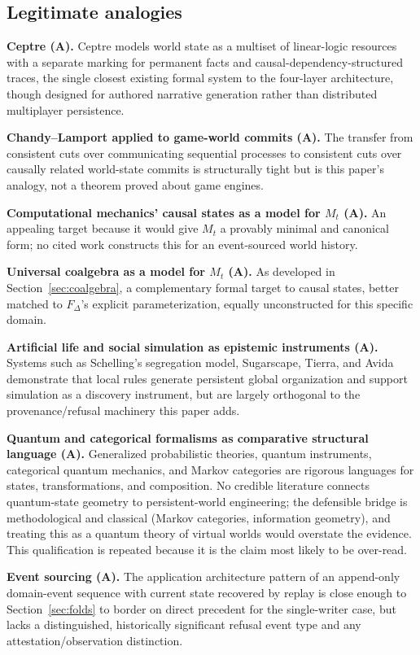 \documentclass[11pt]{article}
\begin{document}
\subsection{Legitimate analogies}
\label{sec:analogies}

\textbf{Ceptre (A).} Ceptre models world state as a multiset of linear-logic resources with a separate marking for permanent facts and causal-dependency-structured traces, the single closest existing formal system to the four-layer architecture, though designed for authored narrative generation rather than distributed multiplayer persistence.

\textbf{Chandy--Lamport applied to game-world commits (A).} The transfer from consistent cuts over communicating sequential processes to consistent cuts over causally related world-state commits is structurally tight but is this paper's analogy, not a theorem proved about game engines.

\textbf{Computational mechanics' causal states as a model for $M_t$ (A).} An appealing target because it would give $M_t$ a provably minimal and canonical form; no cited work constructs this for an event-sourced world history.

\textbf{Universal coalgebra as a model for $M_t$ (A).} As developed in Section~\ref{sec:coalgebra}, a complementary formal target to causal states, better matched to $F_\Delta$'s explicit parameterization, equally unconstructed for this specific domain.

\textbf{Artificial life and social simulation as epistemic instruments (A).} Systems such as Schelling's segregation model, Sugarscape, Tierra, and Avida demonstrate that local rules generate persistent global organization and support simulation as a discovery instrument, but are largely orthogonal to the provenance/refusal machinery this paper adds.

\textbf{Quantum and categorical formalisms as comparative structural language (A).} Generalized probabilistic theories, quantum instruments, categorical quantum mechanics, and Markov categories are rigorous languages for states, transformations, and composition. No credible literature connects quantum-state geometry to persistent-world engineering; the defensible bridge is methodological and classical (Markov categories, information geometry), and treating this as a quantum theory of virtual worlds would overstate the evidence. This qualification is repeated because it is the claim most likely to be over-read.

\textbf{Event sourcing (A).} The application architecture pattern of an append-only domain-event sequence with current state recovered by replay is close enough to Section~\ref{sec:folds} to border on direct precedent for the single-writer case, but lacks a distinguished, historically significant refusal event type and any attestation/observation distinction.
\end{document}
